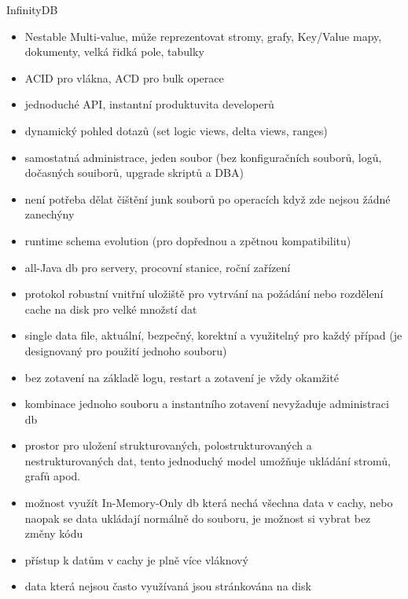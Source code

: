 \documentclass{article}
\begin{document}
	\begin{subsubsection}{InfinityDB}
		\begin{itemize}
			\item Nestable Multi-value, může reprezentovat stromy, grafy, Key/Value mapy, dokumenty, velká řidká pole, tabulky
			\item ACID pro vlákna, ACD pro bulk operace
			\item jednoduché API, instantní produktuvita developerů
			\item dynamický pohled dotazů (set logic views, delta views, ranges)
			\item samostatná administrace, jeden soubor (bez konfiguračních souborů, logů, dočasných souiborů, upgrade skriptů a DBA)
			\item není potřeba dělat čištění junk souborů po operacích když zde nejsou žádné zanechýny
			\item runtime schema evolution (pro dopřednou a zpětnou kompatibilitu)
			\item all-Java db pro servery, procovní stanice, roční zařízení
			\item protokol robustní vnitřní uložiště pro vytrvání na požádání nebo rozdělení cache na disk pro velké množstí dat
			\item single data file, aktuální, bezpečný, korektní a využitelný pro každý případ (je designovaný pro použití jednoho souboru)
			\item bez zotavení na základě logu, restart a zotavení je vždy okamžité
			\item kombinace jednoho souboru a instantního zotavení nevyžaduje administraci db
			\item prostor pro uložení strukturovaných, polostrukturovaných a nestrukturovaných dat, tento jednoduchý model umožňuje ukládání stromů, grafů apod.
			\item možnost využít In-Memory-Only db která nechá všechna data v cachy, nebo naopak se data ukládají normálně do souboru, je možnost si vybrat bez změny kódu
			\item přístup k datům v cachy je plně více vláknový
			\item data která nejsou často využívaná jsou stránkována na disk
		\end{itemize}
	\end{subsubsection}
\end{document}
